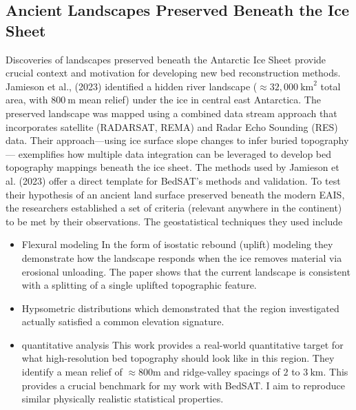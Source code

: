 \subsection{Ancient Landscapes Preserved Beneath the Ice Sheet}\label{Ancient_River}
Discoveries of landscapes preserved beneath the Antarctic Ice Sheet provide crucial context and motivation for developing new bed reconstruction methods. Jamieson et al., (2023) identified a hidden river landscape ($\approx32,000~\mathrm{km}^{2}$ total area, with $800~\mathrm{m}$ mean relief) under the ice in central east Antarctica. The preserved landscape was mapped using a combined data stream approach that incorporates satellite (RADARSAT, REMA) and Radar Echo Sounding (RES) data. Their approach—using ice surface slope changes to infer buried topography— exemplifies how multiple data integration can be leveraged to develop bed topography mappings beneath the ice sheet. 
The methods used by Jamieson et al. (2023) offer a direct template for BedSAT's methods and validation. To test their hypothesis of an ancient land surface preserved beneath the modern EAIS, the researchers established a set of criteria (relevant anywhere in the continent) to be met by their observations. The geostatistical techniques they used include
\begin{itemize}
\item{Flexural modeling} In the form of isostatic rebound (uplift) modeling they demonstrate how the landscape responds when the ice removes material via erosional unloading. The paper shows that the current landscape is consistent with a splitting of a single uplifted topographic feature. 
\item{Hypsometric distributions} which demonstrated that the region investigated actually satisfied a common elevation signature. 
\item{quantitative analysis} This work provides a real-world quantitative target for what high-resolution bed topography should look like in this region. They identify a mean relief of $\approx 800\mathrm{m}$ and ridge-valley spacings of $2$ to $3~\mathrm{km}$. This provides a crucial benchmark for my work with BedSAT. I aim to reproduce similar physically realistic statistical properties. 
\end{itemize}
